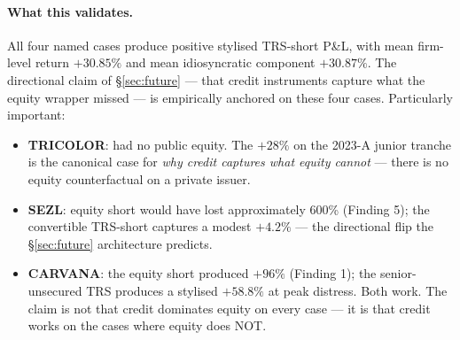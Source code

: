 \documentclass[11pt,a4paper]{article}
\begin{document}
\begin{table}[h]
\centering\footnotesize
{}
\caption{Stylised TRS-short P\&L across four named credit-instrument anchor cases. All four cases produce positive firm-level P\&L. The idiosyncratic component (firm minus HY OAS sector move) is positive on all four, with mean $+30.87\%$ --- directionally validating the §\ref{sec:future} ``credit instruments capture what the equity wrapper missed'' claim. Spread data points cited from the references in column 2 of the source CSV. Source: \texttt{empirics\_v2/out/v2/credit\_anchor\_results.csv}.}\label{tab:credit_anchor}
\end{table}

\paragraph{What this validates.} All four named cases produce positive stylised TRS-short P\&L, with mean firm-level return $+30.85\%$ and mean idiosyncratic component $+30.87\%$. The directional claim of §\ref{sec:future} --- that credit instruments capture what the equity wrapper missed --- is empirically anchored on these four cases. Particularly important:
\begin{itemize}
\item \textbf{TRICOLOR}: had no public equity. The $+28\%$ on the 2023-A junior tranche is the canonical case for \emph{why credit captures what equity cannot} --- there is no equity counterfactual on a private issuer.
\item \textbf{SEZL}: equity short would have lost approximately 600\% (Finding 5); the convertible TRS-short captures a modest $+4.2\%$ --- the directional flip the §\ref{sec:future} architecture predicts.
\item \textbf{CARVANA}: the equity short produced $+96\%$ (Finding 1); the senior-unsecured TRS produces a stylised $+58.8\%$ at peak distress. Both work. The claim is not that credit dominates equity on every case --- it is that credit works on the cases where equity does NOT.
\end{itemize}
\end{document}
